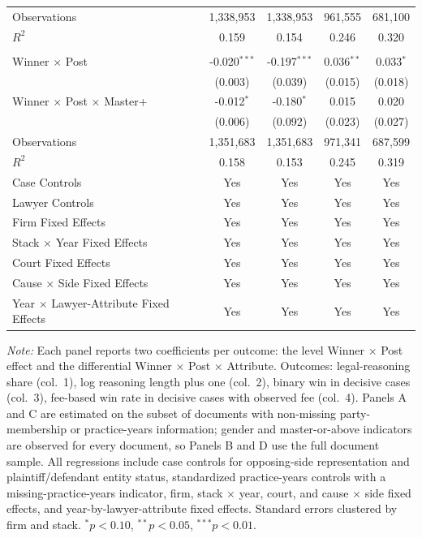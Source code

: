 \begin{table}[!htbp]
\begin{threeparttable}
\begin{tabular}{lcccc}
Observations & 1,338,953 & 1,338,953 & 961,555 & 681,100 \\
$R^2$ & 0.159 & 0.154 & 0.246 & 0.320 \\
\addlinespace
\multicolumn{5}{l}{\textit{Panel D. Educational heterogeneity (master's or above)}} \\
Winner $\times$ Post & -0.020$^{***}$ & -0.197$^{***}$ & 0.036$^{**}$ & 0.033$^{*}$ \\
& (0.003) & (0.039) & (0.015) & (0.018) \\
Winner $\times$ Post $\times$ Master+ & -0.012$^{*}$ & -0.180$^{*}$ & 0.015 & 0.020 \\
& (0.006) & (0.092) & (0.023) & (0.027) \\
Observations & 1,351,683 & 1,351,683 & 971,341 & 687,599 \\
$R^2$ & 0.158 & 0.153 & 0.245 & 0.319 \\
\addlinespace
Case Controls & Yes & Yes & Yes & Yes \\
Lawyer Controls & Yes & Yes & Yes & Yes \\
Firm Fixed Effects & Yes & Yes & Yes & Yes \\
Stack $\times$ Year Fixed Effects & Yes & Yes & Yes & Yes \\
Court Fixed Effects & Yes & Yes & Yes & Yes \\
Cause $\times$ Side Fixed Effects & Yes & Yes & Yes & Yes \\
Year $\times$ Lawyer-Attribute Fixed Effects & Yes & Yes & Yes & Yes \\
\bottomrule
\end{tabular}
\begin{tablenotes}[flushleft]
\footnotesize
\item \textit{Note:} Each panel reports two coefficients per outcome: the level Winner $\times$ Post effect and the differential Winner $\times$ Post $\times$ Attribute. Outcomes: legal-reasoning share (col.\ 1), log reasoning length plus one (col.\ 2), binary win in decisive cases (col.\ 3), fee-based win rate in decisive cases with observed fee (col.\ 4). Panels A and C are estimated on the subset of documents with non-missing party-membership or practice-years information; gender and master-or-above indicators are observed for every document, so Panels B and D use the full document sample. All regressions include case controls for opposing-side representation and plaintiff/defendant entity status, standardized practice-years controls with a missing-practice-years indicator, firm, stack $\times$ year, court, and cause $\times$ side fixed effects, and year-by-lawyer-attribute fixed effects. Standard errors clustered by firm and stack. $^{*}p<0.10$, $^{**}p<0.05$, $^{***}p<0.01$.
\end{tablenotes}
\end{threeparttable}
\end{table}
